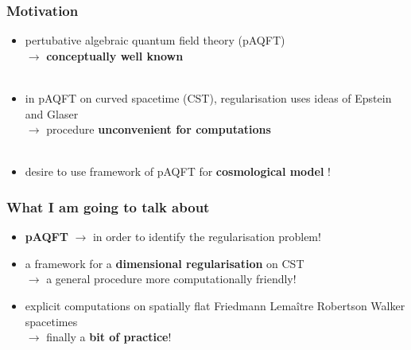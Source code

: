 \documentclass[9pt]{beamer}
\begin{document}

\begin{frame}

\frametitle{Motivation}
  
\begin{itemize}
    
\item pertubative algebraic quantum field theory (pAQFT) \\
$\to$ \textbf{conceptually well known} \\
 \\
    
\item in pAQFT on curved spacetime (CST), regularisation uses ideas of Epstein and Glaser \\
$\to$ procedure \textbf{unconvenient for computations} \\
 \\
    
\item desire to use framework of pAQFT for \textbf{cosmological model} ! \\
  
\end{itemize}

\end{frame}


\begin{frame}

\frametitle{What I am going to talk about}
  
\begin{itemize}
   
\item \textbf{pAQFT} $\to$ in order to identify the regularisation problem! \\
  
\item a framework for a \textbf{dimensional regularisation} on CST \\
$\to$ a general procedure more computationally friendly! \\
   
\item explicit computations on spatially flat Friedmann Lemaître Robertson Walker spacetimes \\
$\to$ finally a \textbf{bit of practice}!
   
\end{itemize}

\end{frame}
\end{document}
